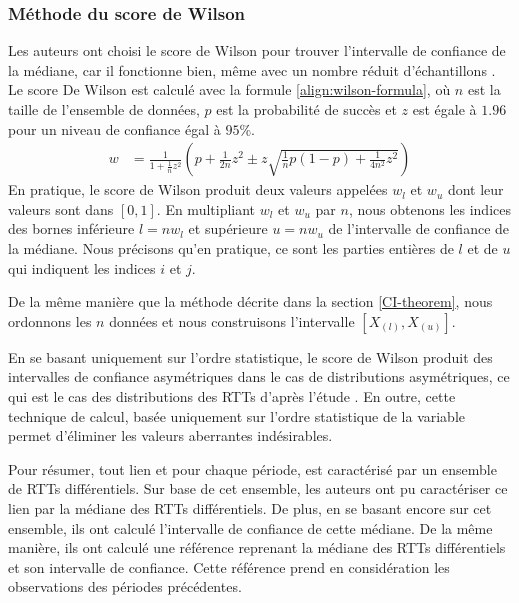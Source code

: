 \subsubsection{Méthode du score de  Wilson}
Les auteurs ont choisi le score de Wilson pour trouver l'intervalle de confiance de la médiane,  car il fonctionne bien, même avec un  nombre réduit d'échantillons \cite{doi:10.1002/sim.2164}. Le score De Wilson est calculé avec la formule \ref{align:wilson-formula}, où  $n$ est la taille de l'ensemble de données, $p$ est la probabilité de succès et $z$ est égale à $1.96$ pour un niveau de confiance égal à $95\%$.
\begin{align}
w&= \frac{1}{1 + \frac{1}{n}z^2} \left( p + \frac{1}{2n} z^2 \pm z \sqrt{\frac{1}{n}p(1-p)+ \frac{1}{4n^2}z^2} \right)\label{align:wilson-formula}
\end{align} 
En pratique, le score de Wilson  produit deux valeurs appelées $w_l$ et $w_u$ dont leur valeurs sont dans $[0, 1]$. En multipliant $w_l$ et $w_u$ par $n$, nous obtenons les indices des bornes inférieure $l = nw_l$  et supérieure $u = nw_u$ de l'intervalle de confiance de la médiane. Nous précisons qu'en pratique, ce sont  les parties entières de $l$ et de $u$ qui indiquent les indices $i$ et $j$. 

De la même manière que la méthode décrite dans la section \ref{CI-theorem}, nous ordonnons les $n$ données et nous construisons l'intervalle $[X_{(l)}, X_{(u)}]$.


En se basant uniquement sur l'ordre statistique, le score de Wilson produit des intervalles de confiance asymétriques dans le cas de distributions asymétriques, ce qui est le cas  des distributions des RTTs d'après l'étude \cite{DBLP:conf/infocom/FontugneMF15}. En outre, cette technique de calcul, basée uniquement sur l'ordre statistique de la variable permet d'éliminer les valeurs aberrantes indésirables.

Pour résumer, tout lien et pour chaque période,  est caractérisé par un ensemble de RTTs différentiels. Sur base de cet ensemble, les auteurs ont pu  caractériser ce lien par  la médiane  des RTTs différentiels.  De plus, en se basant encore sur cet ensemble, ils ont calculé l'intervalle de confiance de cette médiane. De la même manière, ils ont calculé une référence reprenant la médiane des RTTs différentiels et son intervalle de confiance. Cette référence prend en considération les observations des périodes précédentes.  



